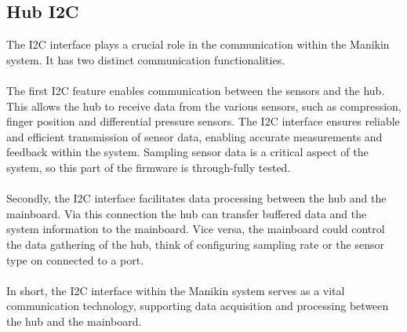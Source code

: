 \subsection{Hub I2C}
The I2C interface plays a crucial role in the communication within the Manikin system. It has two distinct communication functionalities. \\\\
The first I2C feature enables communication between the sensors and the hub. This allows the hub to receive data from the various sensors, such as compression, finger position and differential pressure sensors. The I2C interface ensures reliable and efficient transmission of sensor data, enabling accurate measurements and feedback within the system. Sampling sensor data is a critical aspect of the system, so this part of the firmware is through-fully tested. \\\\ 
Secondly, the I2C interface facilitates data processing between the hub and the mainboard. Via this connection the hub can transfer buffered data and the system information to the mainboard. Vice versa, the mainboard could control the data gathering of the hub, think of configuring sampling rate or the sensor type on connected to a port. \\\\
In short, the I2C interface within the Manikin system serves as a vital communication technology, supporting data acquisition and processing between the hub and the mainboard.


